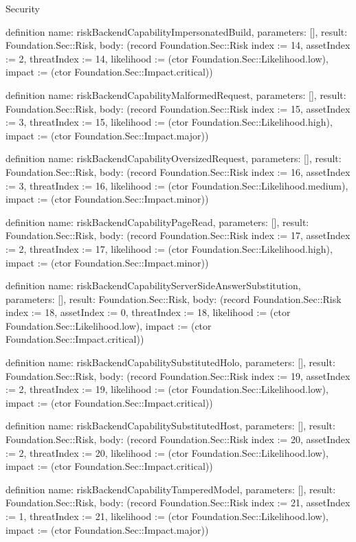\begin{lexlean}{Security}
\begin{semanticmodule}
definition{
  name: riskBackendCapabilityImpersonatedBuild,
  parameters: [],
  result: Foundation.Sec::Risk,
  body: (record Foundation.Sec::Risk {index := 14, assetIndex := 2, threatIndex := 14, likelihood := (ctor Foundation.Sec::Likelihood.low), impact := (ctor Foundation.Sec::Impact.critical)})
}

definition{
  name: riskBackendCapabilityMalformedRequest,
  parameters: [],
  result: Foundation.Sec::Risk,
  body: (record Foundation.Sec::Risk {index := 15, assetIndex := 3, threatIndex := 15, likelihood := (ctor Foundation.Sec::Likelihood.high), impact := (ctor Foundation.Sec::Impact.major)})
}

definition{
  name: riskBackendCapabilityOversizedRequest,
  parameters: [],
  result: Foundation.Sec::Risk,
  body: (record Foundation.Sec::Risk {index := 16, assetIndex := 3, threatIndex := 16, likelihood := (ctor Foundation.Sec::Likelihood.medium), impact := (ctor Foundation.Sec::Impact.minor)})
}

definition{
  name: riskBackendCapabilityPageRead,
  parameters: [],
  result: Foundation.Sec::Risk,
  body: (record Foundation.Sec::Risk {index := 17, assetIndex := 2, threatIndex := 17, likelihood := (ctor Foundation.Sec::Likelihood.high), impact := (ctor Foundation.Sec::Impact.minor)})
}

definition{
  name: riskBackendCapabilityServerSideAnswerSubstitution,
  parameters: [],
  result: Foundation.Sec::Risk,
  body: (record Foundation.Sec::Risk {index := 18, assetIndex := 0, threatIndex := 18, likelihood := (ctor Foundation.Sec::Likelihood.low), impact := (ctor Foundation.Sec::Impact.critical)})
}

definition{
  name: riskBackendCapabilitySubstitutedHolo,
  parameters: [],
  result: Foundation.Sec::Risk,
  body: (record Foundation.Sec::Risk {index := 19, assetIndex := 2, threatIndex := 19, likelihood := (ctor Foundation.Sec::Likelihood.low), impact := (ctor Foundation.Sec::Impact.critical)})
}

definition{
  name: riskBackendCapabilitySubstitutedHost,
  parameters: [],
  result: Foundation.Sec::Risk,
  body: (record Foundation.Sec::Risk {index := 20, assetIndex := 2, threatIndex := 20, likelihood := (ctor Foundation.Sec::Likelihood.low), impact := (ctor Foundation.Sec::Impact.critical)})
}

definition{
  name: riskBackendCapabilityTamperedModel,
  parameters: [],
  result: Foundation.Sec::Risk,
  body: (record Foundation.Sec::Risk {index := 21, assetIndex := 1, threatIndex := 21, likelihood := (ctor Foundation.Sec::Likelihood.low), impact := (ctor Foundation.Sec::Impact.major)})
}


\end{semanticmodule}
\end{lexlean}
